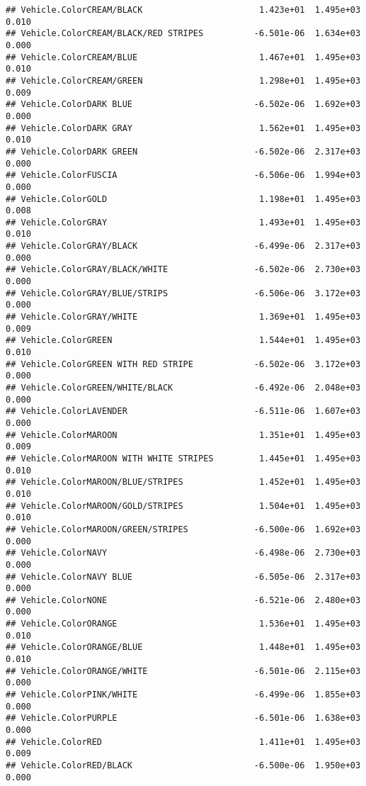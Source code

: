 \documentclass[
]{article}
\begin{document}
\begin{verbatim}
## Vehicle.ColorCREAM/BLACK                       1.423e+01  1.495e+03   0.010
## Vehicle.ColorCREAM/BLACK/RED STRIPES          -6.501e-06  1.634e+03   0.000
## Vehicle.ColorCREAM/BLUE                        1.467e+01  1.495e+03   0.010
## Vehicle.ColorCREAM/GREEN                       1.298e+01  1.495e+03   0.009
## Vehicle.ColorDARK BLUE                        -6.502e-06  1.692e+03   0.000
## Vehicle.ColorDARK GRAY                         1.562e+01  1.495e+03   0.010
## Vehicle.ColorDARK GREEN                       -6.502e-06  2.317e+03   0.000
## Vehicle.ColorFUSCIA                           -6.506e-06  1.994e+03   0.000
## Vehicle.ColorGOLD                              1.198e+01  1.495e+03   0.008
## Vehicle.ColorGRAY                              1.493e+01  1.495e+03   0.010
## Vehicle.ColorGRAY/BLACK                       -6.499e-06  2.317e+03   0.000
## Vehicle.ColorGRAY/BLACK/WHITE                 -6.502e-06  2.730e+03   0.000
## Vehicle.ColorGRAY/BLUE/STRIPS                 -6.506e-06  3.172e+03   0.000
## Vehicle.ColorGRAY/WHITE                        1.369e+01  1.495e+03   0.009
## Vehicle.ColorGREEN                             1.544e+01  1.495e+03   0.010
## Vehicle.ColorGREEN WITH RED STRIPE            -6.502e-06  3.172e+03   0.000
## Vehicle.ColorGREEN/WHITE/BLACK                -6.492e-06  2.048e+03   0.000
## Vehicle.ColorLAVENDER                         -6.511e-06  1.607e+03   0.000
## Vehicle.ColorMAROON                            1.351e+01  1.495e+03   0.009
## Vehicle.ColorMAROON WITH WHITE STRIPES         1.445e+01  1.495e+03   0.010
## Vehicle.ColorMAROON/BLUE/STRIPES               1.452e+01  1.495e+03   0.010
## Vehicle.ColorMAROON/GOLD/STRIPES               1.504e+01  1.495e+03   0.010
## Vehicle.ColorMAROON/GREEN/STRIPES             -6.500e-06  1.692e+03   0.000
## Vehicle.ColorNAVY                             -6.498e-06  2.730e+03   0.000
## Vehicle.ColorNAVY BLUE                        -6.505e-06  2.317e+03   0.000
## Vehicle.ColorNONE                             -6.521e-06  2.480e+03   0.000
## Vehicle.ColorORANGE                            1.536e+01  1.495e+03   0.010
## Vehicle.ColorORANGE/BLUE                       1.448e+01  1.495e+03   0.010
## Vehicle.ColorORANGE/WHITE                     -6.501e-06  2.115e+03   0.000
## Vehicle.ColorPINK/WHITE                       -6.499e-06  1.855e+03   0.000
## Vehicle.ColorPURPLE                           -6.501e-06  1.638e+03   0.000
## Vehicle.ColorRED                               1.411e+01  1.495e+03   0.009
## Vehicle.ColorRED/BLACK                        -6.500e-06  1.950e+03   0.000

\end{verbatim}
\end{document}
